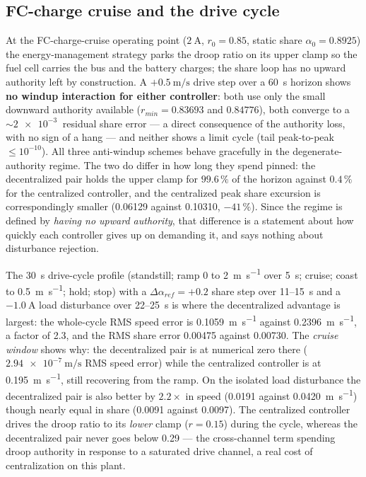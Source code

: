 \documentclass[energies,article,submit,pdftex,oneauthor]{Definitions/mdpi}
\begin{document}
\subsection{FC-charge cruise and the drive cycle}

At the FC-charge-cruise operating point ($\SI{2}{\ampere}$, $r_0 = 0.85$, static share
$\alpha_0 = 0.8925$) the energy-management strategy parks the droop ratio on its upper clamp so
the fuel cell carries the bus and the battery charges; the share loop has no upward authority
left by construction. A $+\SI{0.5}{\meter\per\second}$ drive step over a \SI{60}{\second} horizon
shows \textbf{no windup interaction for either controller}: both use only the small downward
authority available ($r_{min} = 0.83693$ and $0.84776$), both converge to a $\sim\SI{2e-3}{}$
residual share error --- a direct consequence of the authority loss, with no sign of a hang --- and neither shows a limit cycle
(tail peak-to-peak $\le 10^{-10}$). All three anti-windup schemes behave gracefully in the
degenerate-authority regime. The two do differ in how long they spend pinned: the decentralized
pair holds the upper clamp for $99.6\,\%$ of the horizon against $0.4\,\%$ for the centralized
controller, and the centralized peak share excursion is correspondingly smaller
(\num{0.06129} against \num{0.10310}, $-41\,\%$). Since the regime is defined by \emph{having no
upward authority}, that difference is a statement about how quickly each controller gives up on
demanding it, and says nothing about disturbance rejection.

The \SI{30}{\second} drive-cycle profile (standstill; ramp 0 to \SI{2}{\meter\per\second} over
\SI{5}{\second}; cruise; coast to \SI{0.5}{\meter\per\second}; hold; stop) with a
$\Delta\alpha_{ref} = +0.2$ share step over 11--\SI{15}{\second} and a $-\SI{1.0}{\ampere}$ load
disturbance over 22--\SI{25}{\second} is where the decentralized advantage is largest: the
whole-cycle RMS speed error is \SI{0.1059}{\meter\per\second} against
\SI{0.2396}{\meter\per\second}, a factor of \num{2.3}, and the RMS share error \num{0.00475}
against \num{0.00730}. The \emph{cruise window} shows why: the decentralized pair is at numerical
zero there ($\SI{2.94e-7}{\meter\per\second}$ RMS speed error) while the centralized controller is
at \SI{0.195}{\meter\per\second}, still recovering from the ramp. On the isolated load disturbance
the decentralized pair is also better by $2.2\times$ in speed
(\SI{0.0191}{} against \SI{0.0420}{\meter\per\second}) though nearly equal in share
(\num{0.0091} against \num{0.0097}). The centralized controller drives
the droop ratio to its \emph{lower} clamp ($r = 0.15$) during the cycle, whereas the decentralized
pair never goes below \num{0.29} --- the cross-channel term spending droop authority in response
to a saturated drive channel, a real cost of centralization on this plant.
\end{document}
